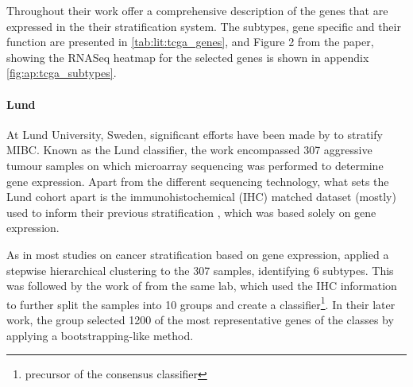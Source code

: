 Throughout their work \citet{Robertson2017-mg} offer a comprehensive description of the genes that are expressed in the their stratification system. The subtypes, gene specific and their function are presented in \cref{tab:lit:tcga_genes}, and Figure 2 from the paper, showing the RNASeq heatmap for the selected genes is shown in appendix \cref{fig:ap:tcga_subtypes}.

\paragraph*{Lund} \label{s:lit:lund_mibc}

At Lund University, Sweden, significant efforts have been made by \citet{Sjodahl2017-xr, Marzouka2018-ge} to stratify MIBC. Known as the Lund classifier, the work encompassed 307 aggressive tumour samples on which microarray sequencing was performed to determine gene expression. Apart from the different sequencing technology, what sets the Lund cohort apart is the immunohistochemical (IHC) matched dataset (mostly) used to inform their previous stratification \citet{Sjodahl2017-xr}, which was based solely on gene expression.

As in most studies on cancer stratification based on gene expression, \citet{Sjodahl2017-xr} applied a stepwise hierarchical clustering to the 307 samples, identifying 6 subtypes. This was followed by the work of \citet{Marzouka2018-ge} from the same lab, which used the IHC information to further split the samples into 10 groups and create a classifier\footnote{precursor of the consensus classifier}. In their later work, the group selected 1200 of the most representative genes of the classes by applying a bootstrapping-like method.

